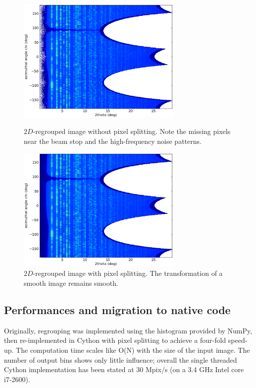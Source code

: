 \documentclass[a4paper]{jpconf}
\begin{document}
\begin{figure}[h]
\begin{minipage}{8cm}
\includegraphics[width=8cm]{img/2Dhistogram.eps}
\caption{\label{rough}$2D$-regrouped image without pixel splitting. Note
the missing pixels near the beam stop and the high-frequency noise patterns.}
\end{minipage}\hspace{5mm}
\begin{minipage}{8cm}
\includegraphics[width=8cm]{img/2DwithSplit.eps}
\caption{\label{smooth}$2D$-regrouped image with pixel splitting. The
transformation of a smooth image remains smooth.}
\end{minipage}
\end{figure}


\subsection{Performances and migration to native code}
Originally, regrouping was implemented using the histogram provided by
NumPy\cite{numpy}, then re-implemented in Cython\cite{cython} with pixel
splitting to achieve a four-fold speed-up.
The computation time scales like O(N) with the size of the input image.
The number of output bins shows only little influence; overall the single
threaded Cython implementation has been stated at 30 Mpix/s (on a 3.4 GHz Intel
core i7-2600).
\end{document}
